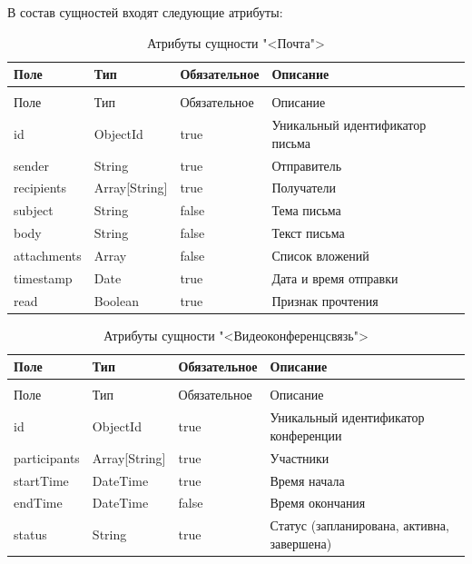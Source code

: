 В состав сущностей входят следующие атрибуты:

\begin{xltabular}{\textwidth}{|l|l|p{3.2cm}|X|}
  \caption{Атрибуты сущности "<Почта">\label{mail:table}}\\ \hline
  Поле & Тип & Обязательное & Описание \\ \hline
  \endfirsthead
  \\ \hline
  Поле & Тип & Обязательное & Описание \\ \hline
  \endhead
  id & ObjectId & true & Уникальный идентификатор письма \\ \hline
  sender & String & true & Отправитель \\ \hline
  recipients & Array[String] & true & Получатели \\ \hline
  subject & String & false & Тема письма \\ \hline
  body & String & false & Текст письма \\ \hline
  attachments & Array & false & Список вложений \\ \hline
  timestamp & Date & true & Дата и время отправки \\ \hline
  read & Boolean & true & Признак прочтения \\ \hline
\end{xltabular}

\begin{xltabular}{\textwidth}{|l|l|p{3.2cm}|X|}
  \caption{Атрибуты сущности "<Видеоконференцсвязь">\label{video:table}}\\ \hline
  Поле & Тип & Обязательное & Описание \\ \hline
  \endfirsthead
  \\ \hline
  Поле & Тип & Обязательное & Описание \\ \hline
  \endhead
  id & ObjectId & true & Уникальный идентификатор конференции \\ \hline
  participants & Array[String] & true & Участники \\ \hline
  startTime & DateTime & true & Время начала \\ \hline
  endTime & DateTime & false & Время окончания \\ \hline
  status & String & true & Статус (запланирована, активна, завершена) \\ \hline
\end{xltabular}

